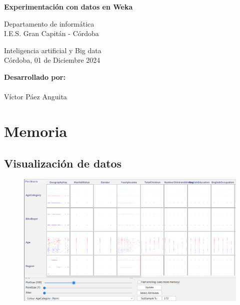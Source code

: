 \documentclass[12pt]{article}
\begin{document}
\begin{titlepage}
    \begin{center}
      \Large \bfseries{}
    \end{center}
    \vspace{0.1cm}
    \begin{center}
      \Large \bfseries{}
    \end{center}
    \vspace{0.1cm}
    \begin{center}
     \Large \bfseries{Experimentación con datos en Weka}
    \end{center}
    \vspace{0.0001cm}
    \begin{center}
        Departamento de informática \\ I.E.S. Gran Capitán - Córdoba
    \end{center}
        \vspace{2 cm}
    \vspace{0.2 cm}
    \begin{center}
        Inteligencia artificial y Big data \\ Córdoba, 01 de Diciembre 2024
    \end{center}
    \vspace{12 cm}
\null\hfill \textbf{Desarrollado por:}
\\
\\
\null\hfill Víctor Páez Anguita
\clearpage
\end{titlepage}

\tableofcontents
\clearpage

\section{Memoria}

\subsection{Visualización de datos}

\begin{figure}[h!]
    \centering
    \includegraphics[width=.6\textwidth]{Visualizacion.PNG}
    \label{fig:my_label}
\end{figure}
\end{document}
